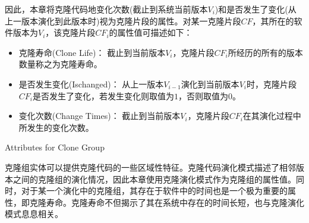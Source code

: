 因此，本章将克隆代码地变化次数(截止到系统当前版本$V_i$)和是否发生了变化(从上一版本演化到此版本时)视为克隆片段的属性。对某一克隆片段$CF$，其所在的软件版本为$V_i$，该克隆片段$CF_i$的属性值可描述如下：
\begin{itemize}
\item
克隆寿命(Clone Life)：
截止到当前版本$V_ i $，克隆片段$CF_i$所经历的所有的版本数量称之为克隆寿命。
\item
是否发生变化(Ischanged)：
从上一版本$V_{i-1} $演化到当前版本$V_ i $时，克隆片段$CF_i$是否发生了变化，若发生变化则取值为$1$，否则取值为$0$。
\item
变化次数(Change Times)：
截止到当前版本$V_ i $，克隆片段$CF_i$在其演化过程中所发生的变化次数。
\end{itemize}

{Attributes for Clone Group}

克隆组实体可以提供克隆代码的一些区域性特征。克隆代码演化模式描述了相邻版本之间的克隆组的演化情况，因此本章使用克隆演化模式作为克隆组的属性值。同时，对于某一个演化中的克隆组，其存在于软件中的时间也是一个极为重要的属性，即克隆寿命。克隆寿命不但揭示了其在系统中存在的时间长短，也与克隆演化模式息息相关。

